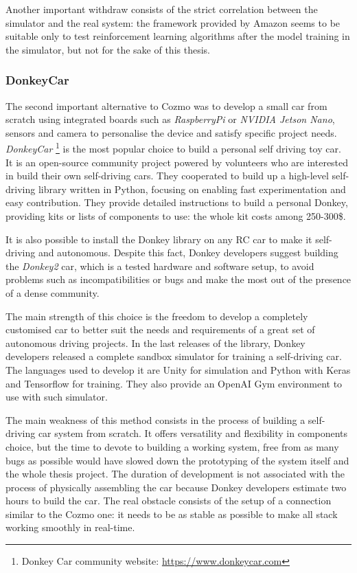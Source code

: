 Another important withdraw consists of the strict correlation between the simulator and the real system: the framework provided by Amazon seems to be suitable only to test reinforcement learning algorithms after the model training in the simulator, but not for the sake of this thesis.

\subsubsection{Donkey\textregistered Car}

The second important alternative to Cozmo was to develop a small car from scratch using integrated boards such as \textit{RaspberryPi} or \textit{NVIDIA Jetson Nano}, sensors and camera to personalise the device and satisfy specific project needs.
\textit{Donkey\textregistered Car} \footnote{Donkey Car community website: \href{https://www.donkeycar.com}{https://www.donkeycar.com}} is the most popular choice to build a personal self driving toy car.
It is an open-source community project powered by volunteers who are interested in build their own self-driving cars.
They cooperated to build up a high-level self-driving library written in Python, focusing on enabling fast experimentation and easy contribution.
They provide detailed instructions to build a personal Donkey, providing kits or lists of components to use: the whole kit costs among 250-300\$.

It is also possible to install the Donkey library on any RC car to make it self-driving and autonomous.
Despite this fact, Donkey developers suggest building the \textit{Donkey2} car, which is a tested hardware and software setup, to avoid problems such as incompatibilities or bugs and make the most out of the presence of a dense community.

The main strength of this choice is the freedom to develop a completely customised car to better suit the needs and requirements of a great set of autonomous driving projects.
In the last releases of the library, Donkey developers released a complete sandbox simulator for training a self-driving car.
The languages used to develop it are Unity for simulation and Python with Keras and Tensorflow for training.
They also provide an OpenAI Gym environment to use with such simulator.

The main weakness of this method consists in the process of building a self-driving car system from scratch.
It offers versatility and flexibility in components choice, but the time to devote to building a working system, free from as many bugs as possible would have slowed down the prototyping of the system itself and the whole thesis project.
The duration of development is not associated with the process of physically assembling the car because Donkey developers estimate two hours to build the car.
The real obstacle consists of the setup of a connection similar to the Cozmo one: it needs to be as stable as possible to make all stack working smoothly in real-time.

